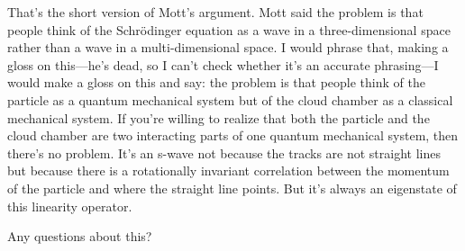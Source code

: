 \documentclass[twocolumn,prb]{revtex4}
\begin{document}
That's the short version of Mott's argument. Mott said the problem is that people think of the Schrödinger equation as a wave in a three-dimensional space rather than a wave in a multi-dimensional space. I would phrase that, making a gloss on this---he's dead, so I can't check whether it's an accurate phrasing---I would make a gloss on this and say: the problem is that people think of the particle as a quantum mechanical system but of the cloud chamber as a classical mechanical system. If you're willing to realize that both the particle and the cloud chamber are two interacting parts of one quantum mechanical system, then there's no problem. It's an s-wave not because the tracks are not straight lines but because there is a rotationally invariant correlation between the momentum of the particle and where the straight line points. But it's always an eigenstate of this linearity operator.

Any questions about this?
\end{document}
